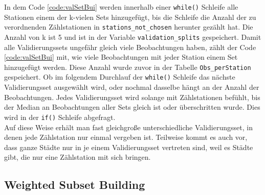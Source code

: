 \documentclass[a4paper,12pt]{thesis}
\begin{document}
In dem Code \ref{code:valSetBui} werden innerhalb einer \lstinline|while()| Schleife alle Stationen einem der k-vielen Sets hinzugefügt, bis die Schleife die Anzahl der zu verordnenden Zählstationen in \lstinline|stations_not_chosen| herunter gezählt hat. Die Anzahl von k ist 5 und ist in der Variable \lstinline|validation_splits| gespeichert. Damit alle Validierungssets ungefähr gleich viele Beobachtungen haben, zählt der Code \ref{code:valSetBui} mit, wie viele Beobachtungen mit jeder Station einem Set hinzugefügt werden. Diese Anzahl wurde zuvor in der Tabelle \lstinline|Obs_perStation| gespeichert. Ob im folgendem Durchlauf der \lstinline|while()| Schleife das nächste Validierungsset ausgewählt wird, oder nochmal dasselbe hängt an der Anzahl der Beobachtungen. Jedes Validierungsset wird solange mit Zählstationen befühlt, bis der Median an Beobachtungen aller Sets gleich ist oder überschritten wurde. Dies wird in der \lstinline|if()| Schleife abgefragt.\\
Auf diese Weise erhält man fast gleichgroße unterschiedliche Validierungsset, in denen jede Zählstation nur einmal vergeben ist. Teilweise kommt es auch vor, dass ganze Städte nur in je einem Validierungsset vertreten sind, weil es Städte gibt, die nur eine Zählstation mit sich bringen.

\subsection{Weighted Subset Building}
\end{document}
